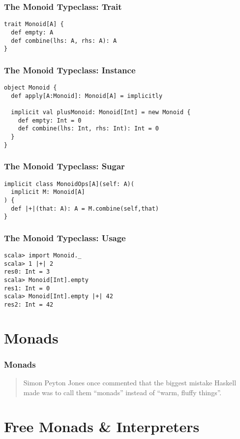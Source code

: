 \documentclass{beamer}
\begin{document}
\begin{frame}[fragile]
  \frametitle{The Monoid Typeclass: Trait}
\begin{verbatim}
trait Monoid[A] {
  def empty: A
  def combine(lhs: A, rhs: A): A
}
\end{verbatim}
\end{frame}

\begin{frame}[fragile]
  \frametitle{The Monoid Typeclass: Instance}
\begin{verbatim}
object Monoid {
  def apply[A:Monoid]: Monoid[A] = implicitly

  implicit val plusMonoid: Monoid[Int] = new Monoid {
    def empty: Int = 0
    def combine(lhs: Int, rhs: Int): Int = 0
  }
}
\end{verbatim}
\end{frame}

\begin{frame}[fragile]
  \frametitle{The Monoid Typeclass: Sugar}
\begin{verbatim}
implicit class MonoidOps[A](self: A)(
  implicit M: Monoid[A]
) {
  def |+|(that: A): A = M.combine(self,that)
}
\end{verbatim}
\end{frame}

\begin{frame}[fragile]
  \frametitle{The Monoid Typeclass: Usage}
\begin{verbatim}
scala> import Monoid._
scala> 1 |+| 2
res0: Int = 3
scala> Monoid[Int].empty
res1: Int = 0
scala> Monoid[Int].empty |+| 42
res2: Int = 42
\end{verbatim}
\end{frame}

\section{Monads}

\begin{frame}
  \frametitle{Monads}
  \begin{quote}
    Simon Peyton Jones once commented that the biggest mistake
    Haskell made was to call them ``monads'' instead of ``warm, fluffy
    things''.
  \end{quote}
\end{frame}

\section{Free Monads \& Interpreters}
\end{document}
